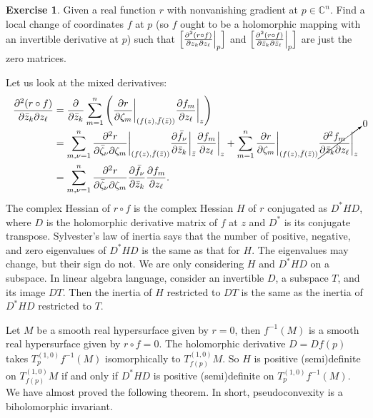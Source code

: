 \documentclass[12pt,openany]{book}
\newcommand{\C}{{\mathbb{C}}}
\theoremstyle{plain}
\theoremstyle{remark}
\theoremstyle{definition}
\newenvironment{exbox}{%
    \def\FrameCommand{\vrule width 1pt \relax\hspace{10pt}}%
    \MakeFramed{\advance\hsize-\width\FrameRestore}%
}{%
    \endMakeFramed
}
\theoremstyle{exercise}
\newtheorem{exercise}{Exercise}[section]
\theoremstyle{example}
\begin{document}
\begin{exbox}
\begin{exercise}
Given a real function $r$ with nonvanishing gradient at $p \in \C^n$.  Find
a local change of coordinates $f$ at $p$ (so $f$ ought to be a holomorphic
mapping with an invertible derivative at $p$) such that
$\Bigl[ \frac{\partial^2 (r \circ f)}{\partial z_k \partial z_\ell} \Big|_p
\Bigr]$
and
$\Bigl[ \frac{\partial^2 (r \circ f)}{\partial \bar{z}_k \partial \bar{z}_\ell}
\Big|_p \Bigr]$
are just the zero matrices.
\end{exercise}
\end{exbox}

Let us look at the mixed derivatives:
\begin{equation*}
\begin{split}
\frac{\partial^2 (r \circ f)}{\partial \bar{z}_k \partial z_\ell}
& =
\frac{\partial}{\partial \bar{z}_k }
\sum_{m=1}^n
\left(
\frac{\partial r}{\partial \zeta_m} \bigg|_{(f(z),\bar{f}(\bar{z}))}
\frac{\partial f_m}{\partial z_\ell} \bigg|_z
\right)
\\
& =
\sum_{m,\nu=1}^n
\frac{\partial^2 r}{\partial \bar{\zeta}_\nu \partial \zeta_m }
\bigg|_{(f(z),\bar{f}(\bar{z}))}
\frac{\partial \bar{f}_\nu}{\partial \bar{z}_k} \bigg|_{\bar{z}}
\frac{\partial f_m}{\partial z_\ell} \bigg|_z
+
\sum_{m=1}^n
\frac{\partial r}{\partial \zeta_m} \bigg|_{(f(z),\bar{f}(\bar{z}))}
\smash{\cancelto{0}{\frac{\partial^2 f_m}{\partial \bar{z}_k \partial
z_\ell} \bigg|_z}}
\\
&=
\sum_{m,\nu=1}^n
\frac{\partial^2 r}{\partial \bar{\zeta}_\nu \partial \zeta_m}
\frac{\partial \bar{f}_\nu}{\partial \bar{z}_k}
\frac{\partial f_m}{\partial z_\ell} .
\end{split}
\end{equation*}
The complex Hessian of $r \circ f$ is the complex Hessian $H$ of $r$
conjugated as $D^*HD$, where $D$ is the holomorphic
derivative matrix of $f$ at $z$ and
$D^*$ is its conjugate transpose.  Sylvester's law of inertia
says that the number of positive, negative, and zero
eigenvalues of $D^*HD$ is the same as that for $H$.  The
eigenvalues may change, but their sign do not.
We are only considering $H$ and $D^*HD$ on a subspace.  In linear algebra
language, consider an invertible $D$, a subspace $T$, and its image $DT$.
Then the inertia of $H$ restricted to $DT$ is the same
as the inertia of $D^*HD$ restricted to $T$.

Let $M$ be a smooth real hypersurface given by $r=0$, then $f^{-1}(M)$ is
a smooth real hypersurface given by $r \circ f = 0$.
The holomorphic derivative $D = Df(p)$
takes
$T_{p}^{(1,0)}f^{-1}(M)$ isomorphically to $T_{f(p)}^{(1,0)}M$.
So $H$ is positive (semi)definite
on $T_{f(p)}^{(1,0)}M$ if and only if $D^*HD$ is positive (semi)definite
on $T_{p}^{(1,0)} f^{-1}(M)$.
We have almost proved the following theorem.  In short, pseudoconvexity is a
biholomorphic invariant.
\end{document}
